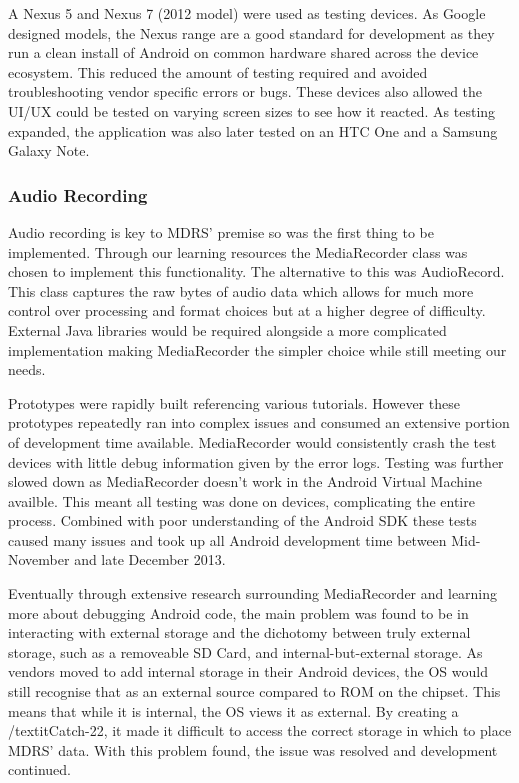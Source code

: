 \documentclass{l3proj}
\begin{document}
A Nexus 5 and Nexus 7 (2012 model) were used as testing devices. As Google
designed models, the Nexus range are a good standard for development as they run
a clean install of Android on common hardware shared across the device
ecosystem. This reduced the amount of testing required and avoided
troubleshooting vendor specific errors or bugs. These devices also allowed the
UI/UX could be tested on varying screen sizes to see how it reacted. As testing
expanded, the application was also later tested on an HTC One and a Samsung Galaxy
Note.

\subsubsection{Audio Recording}    Audio recording is key to MDRS' premise so
was the first thing to be implemented. Through our learning resources the
MediaRecorder class was chosen to implement this functionality. The alternative
to this was AudioRecord. This class captures the raw bytes of audio data which
allows for much more control over processing and format choices but at a higher
degree of difficulty. External Java libraries would be required alongside a more
complicated implementation making MediaRecorder the simpler choice while still
meeting our needs.

Prototypes were rapidly built referencing various tutorials. However these
prototypes repeatedly ran into complex issues and consumed an extensive portion
of development time available. MediaRecorder would consistently crash the test
devices with little debug information given by the error logs. Testing was
further slowed down as MediaRecorder doesn't work in the Android Virtual Machine
availble. This meant all testing was done on devices, complicating the entire
process. Combined with poor understanding of the Android SDK these tests caused
many issues and took up all Android development time between Mid-November and
late December 2013.

Eventually through extensive research surrounding MediaRecorder and learning
more about debugging Android code, the main problem was found to be in
interacting with external storage and the dichotomy between truly external
storage, such as a removeable SD Card, and internal-but-external storage. As
vendors moved to add internal storage in their Android devices, the OS would
still recognise that as an external source compared to ROM on the chipset. This
means that while it is internal, the OS views it as external. By creating a
/textit{Catch-22}, it made it difficult to access the correct storage in which
to place MDRS' data. With this problem found, the issue was resolved and
development continued.
\end{document}
